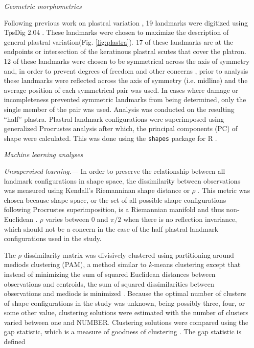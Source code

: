 \documentclass[12pt,letterpaper]{article}
\renewcommand{\subsection}[1]{%
\bigskip
\begin{center}
\begin{large}
\normalfont\itshape #1
\end{large}
\end{center}}
\renewcommand{\subsubsection}[1]{%
\vspace{2ex}
\noindent
\textit{#1.}---}
\begin{document}
\subsection{Geometric morphometrics}
Following previous work on plastral variation \citep{Angielczyk2007,Angielczyk2011,Angielczyk2013a}, 19 landmarks were digitized using TpsDig 2.04 \citep{Rohlf2005}. These landmarks were chosen to maximize the description of general plastral variation(Fig. \ref{fig:plastra}). 17 of these landmarks are at the endpoints or intersection of the keratinous plastral scutes that cover the platron. 12 of these landmarks were chosen to be symmetrical across the axis of symmetry and, in order to prevent degrees of freedom and other concerns \citep{Klingenberg2002}, prior to analysis these landmarks were reflected across the axis of symmetry (i.e. midline) and the average position of each symmetrical pair was used. In cases where damage or incompleteness prevented symmetric landmarks from being determined, only the single member of the pair was used. Analysis was conducted on the resulting ``half'' plastra. Plastral landmark configurations were superimposed using generalized Procrustes analysis \citep{Dryden1998a} after which, the principal components (PC) of shape were calculated. This was done using the \texttt{shapes} package for R \citep{2013,Dryden2013}.


\subsection{Machine learning analyses}
\subsubsection{Unsupervised learning}
In order to preserve the relationship between all landmark configurations in shape space, the dissimilarity between observations was measured using Kendall's Riemanninan shape distance or \(\rho\) \citep{Kendall1984a,Dryden1998a}. This metric was chosen because shape space, or the set of all possible shape configurations following Procrustes superimposition, is a Riemannian manifold and thus non-Euclidean \citep{Dryden1998a}. \(\rho\) varies between 0 and \(\pi / 2\) when there is no reflection invariance, which should not be a concern in the case of the half plastral landmark configurations used in the study.

The \(\rho\) dissimilarity matrix was divisively clustered using partitioning around mediods clustering (PAM), a method similar to \textit{k}-means clustering except that instead of minimizing the sum of squared Euclidean distances between observations and centroids, the sum of squared dissimilarities between observations and mediods is minimized \citep{Kaufman1990}. Because the optimal number of clusters of shape configurations in the study was unknown, being possibly three, four, or some other value, clustering solutions were estimated with the number of clusters varied between one and NUMBER. Clustering solutions were compared using the gap statistic, which is a measure of goodness of clustering \citep{Tibshirani2001a}. The gap statistic is defined
\end{document}
